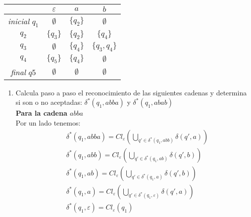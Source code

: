\documentclass{article}
\begin{document}
\begin{enumerate}
\begin{center}
    \begin{tabular}{c|c c c}
        & $\varepsilon$ & $a$ & $b$ \\
        \hline
        \textit{inicial} $q_1$ & $\emptyset$ & $\{q_2\}$ & $\emptyset$ \\
        $q_2$ & $\{q_3\}$ & $\{q_2\}$ & $\{q_4\}$ \\
        $q_3$ & $\emptyset$ & $\{q_4\}$ & $\{q_3, q_4\}$ \\
        $q_4$ & $\{q_5\}$ & $\{q_4\}$ & $\emptyset$ \\
        \textit{final} $q5$ & $\emptyset$ & $\emptyset$ & $\emptyset$
    \end{tabular}
\end{center}

    \begin{enumerate}
    
        \item Calcula paso a paso el reconocimiento de las siguientes cadenas y determina si son o no aceptadas: $\delta^*(q_1, abba)$ y $\delta^*(q_1, abab)$\\
        
        \textbf{Para la cadena $abba$}\\
        Por un lado tenemos:
        \begin{align*}
        &\delta^*(q_1, abba) = Cl_{\varepsilon}(\bigcup_{q' \in \delta^*(q_1, abb)} \delta(q',a)) \\
        &\delta^*(q_1, abb) = Cl_{\varepsilon}(\bigcup_{q' \in \delta^*(q_1, ab)} \delta(q',b)) \\
        &\delta^*(q_1, ab) = Cl_{\varepsilon}(\bigcup_{q' \in \delta^*(q_1, a)} \delta(q',b)) \\
        &\delta^*(q_1, a) = Cl_{\varepsilon}(\bigcup_{q' \in \delta^*(q_1, \varepsilon)} \delta(q',a)) \\
        &\delta^*(q_1, \varepsilon) = Cl_{\varepsilon}(q_1) \\
        \end{align*}
        

\end{enumerate}
\end{enumerate}
\end{document}
